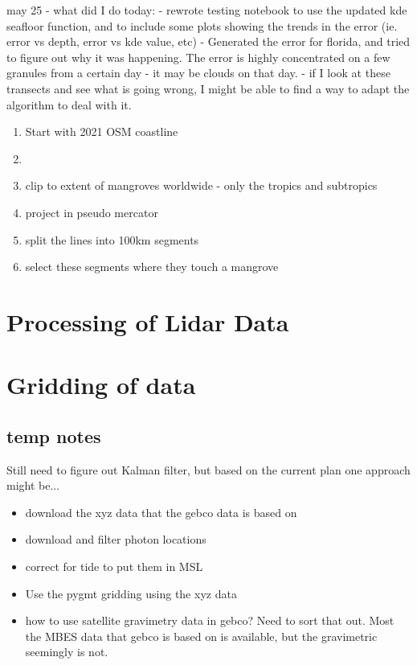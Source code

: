 may 25 - what did I do today:
- rewrote testing notebook to use the updated kde seafloor function, and to include some plots showing the trends in the error (ie. error vs depth, error vs kde value, etc)
- Generated the error for florida, and tried to figure out why it was happening. The error is highly concentrated on a few granules from a certain day - it may be clouds on that day.
- if I look at these transects and see what is going wrong, I might be able to find a way to adapt the algorithm to deal with it.
\begin{enumerate}
    \color{orange}
    \item Start with 2021 OSM coastline
    \item 
    \item clip to extent of mangroves worldwide - only the tropics and subtropics
    \item project in pseudo mercator
    \item split the lines into 100km segments
    \item select these segments where they touch a mangrove 
\end{enumerate}


\section{Processing of Lidar Data}

\section{Gridding of data}
\subsection{temp notes}
Still need to figure out Kalman filter, but based on the current plan one approach might be...
\begin{itemize}
    \color{orange}
    \item download the xyz data that the gebco data is based on
    \item download and filter photon locations
    \item correct for tide to put them in MSL
    \item Use the pygmt gridding using the xyz data
    \item how to use satellite gravimetry data in gebco? Need to sort that out. Most the MBES data that gebco is based on is available, but the gravimetric seemingly is not.
\end{itemize}